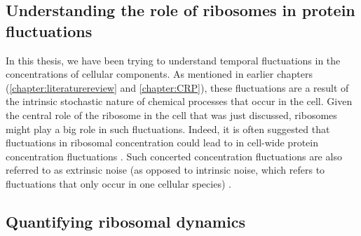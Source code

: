 \subsection{Understanding the role of ribosomes in protein fluctuations}

In this thesis, 
we have been trying to 
understand %
temporal fluctuations in the concentrations of cellular components.%
%
As mentioned in earlier chapters (\ref{chapter:literaturereview} and  \ref{chapter:CRP}),
these fluctuations are a result of the intrinsic stochastic nature of chemical processes that occur in the cell.
%
Given the central role of the ribosome in the cell that was just discussed, ribosomes might play a big role in such fluctuations.
Indeed, it is often suggested that fluctuations in ribosomal concentration could lead to in cell-wide protein concentration fluctuations \cite{Davidson2008, Raj2008, Chalancon2012, Bruggeman2018}.
%
Such concerted concentration fluctuations are also referred to as extrinsic noise (as opposed to intrinsic noise, which refers to fluctuations that only occur in one cellular species) \cite{Elowitz2002}.

\subsection{Quantifying ribosomal dynamics}
\label{section:ribos:walker}

